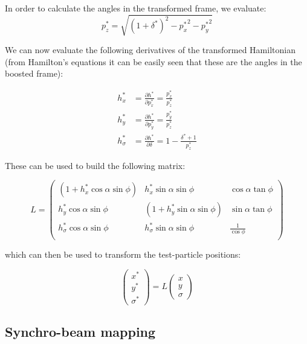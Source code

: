 In order to calculate the angles in the transformed frame, we evaluate:
\begin{equation}
p^*_z  =  \sqrt{\left(1+\delta^*\right)^2-{p_x^*}^2-{p_y^*}^2}
\end{equation}

We can now evaluate the following derivatives of the transformed Hamiltonian (from Hamilton's equations it can be easily seen that these are the angles in the boosted frame):

\begin{align}
h^*_x &= \frac{\partial h^*}{\partial p^*_x} = \frac{p^*_x}{p^*_z}\\
h^*_y &= \frac{\partial h^*}{\partial p^*_y} = \frac{p^*_y}{p^*_z}\\
h^*_\sigma &= \frac{\partial h^*}{\partial \delta} = 1-\frac{\delta^*+1}{p^*_z}
\end{align}

These can be used to build the following matrix:

\begin{equation}
L  =\left( \begin{matrix}

\left( 1 + h^*_x \cos \alpha \sin \phi\right) & h^*_x \sin \alpha \sin \phi & \cos \alpha \tan \phi \\
h_y^* \cos \alpha \sin \phi & \left( 1 + h^*_y \sin \alpha \sin \phi\right) & \sin \alpha \tan \phi\\
h_\sigma^* \cos \alpha \sin \phi & h_\sigma^* \sin \alpha \sin \phi  & \frac{1}{\cos \phi}\\
\end{matrix} \right)
\label{eq:Lmat}
\end{equation}

which can then be used to transform the test-particle positions:

\begin{equation}
\left( \begin{matrix}
x^*\\
y^*\\
\sigma^*
\end{matrix}\right) = 
L 
\left( \begin{matrix}
x\\
y\\
\sigma
\end{matrix}\right)
\end{equation}


\subsection{Synchro-beam mapping}

